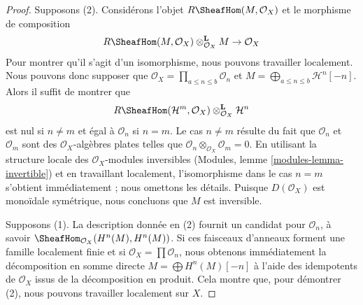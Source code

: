 \begin{proof}

Supposons (2). Considérons l'objet $R\SheafHom(M, \mathcal{O}_X)$
et le morphisme de composition
$$
R\SheafHom(M, \mathcal{O}_X) \otimes_{\mathcal{O}_X}^\mathbf{L} M \to
\mathcal{O}_X
$$
Pour montrer qu'il s'agit d'un isomorphisme, nous pouvons travailler localement. Nous pouvons donc supposer que $\mathcal{O}_X = \prod_{a \leq n \leq b} \mathcal{O}_n$
et $M = \bigoplus_{a \leq n \leq b} \mathcal{H}^n[-n]$. Alors il suffit de montrer que
$$
R\SheafHom(\mathcal{H}^m, \mathcal{O}_X)
\otimes_{\mathcal{O}_X}^\mathbf{L} \mathcal{H}^n
$$
est nul si $n \not = m$ et égal à $\mathcal{O}_n$ si $n = m$. Le cas $n \not = m$ résulte du fait que $\mathcal{O}_n$ et
$\mathcal{O}_m$ sont des $\mathcal{O}_X$-algèbres plates telles que
$\mathcal{O}_n \otimes_{\mathcal{O}_X} \mathcal{O}_m = 0$. En utilisant la structure locale des $\mathcal{O}_X$-modules inversibles (Modules, lemme \ref{modules-lemma-invertible}) et en travaillant localement, l'isomorphisme dans le cas $n = m$ s'obtient immédiatement ; nous omettons les détails. Puisque $D(\mathcal{O}_X)$ est monoïdale symétrique, nous concluons que $M$ est inversible.

\medskip\noindent
Supposons (1). La description donnée en (2) fournit un candidat pour $\mathcal{O}_n$, à savoir $\SheafHom_{\mathcal{O}_X}(H^n(M), H^n(M))$. Si ces faisceaux d'anneaux forment une famille localement finie et si $\mathcal{O}_X = \prod \mathcal{O}_n$, nous obtenons immédiatement la décomposition en somme directe $M = \bigoplus H^n(M)[-n]$ à l'aide des idempotents de $\mathcal{O}_X$ issus de la décomposition en produit. Cela montre que, pour démontrer (2), nous pouvons travailler localement sur $X$.

\medskip\noindent


\end{proof}
